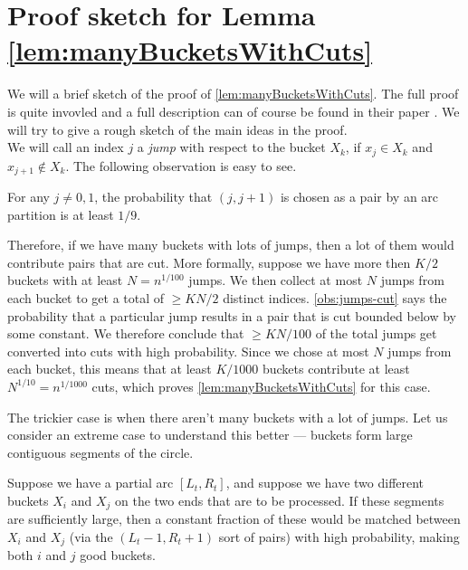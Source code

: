 \section{Proof sketch for Lemma \ref{lem:manyBucketsWithCuts}}

We will a brief sketch of the proof of \autoref{lem:manyBucketsWithCuts}.
The full proof is quite invovled and a full description can of course be found in their paper \cite{dmpy12}.
We will try to give a rough sketch of the main ideas in the proof. \\

We will call an index $j$ a \emph{jump} with respect to the bucket $X_k$, if $x_j \in X_k$ and $x_{j+1} \notin X_k$.
The following observation is easy to see.


\begin{observation}\label{obs:jumps-cut}
  For any $j\neq 0,1$, the probability that $(j,j+1)$ is chosen as a pair by an arc partition is at least $1/9$. 
\end{observation}

Therefore, if we have many buckets with lots of jumps, then a lot of them would contribute pairs that are cut.
More formally, suppose we have more then $K/2$ buckets with at least $N = n^{1/100}$ jumps.
We then collect at most $N$ jumps from each bucket to get a total of $\geq KN/2$ distinct indices.
\autoref{obs:jumps-cut} says the probability that a particular jump results in a pair that is cut bounded below by some constant.
We therefore conclude that $\geq KN/100$ of the total jumps get converted into cuts with high probability.
Since we chose at most $N$ jumps from each bucket, this means that at least $K/1000$ buckets contribute at least $N^{1/10} = n^{1/1000}$ cuts, which proves \autoref{lem:manyBucketsWithCuts} for this case.

\medskip

The trickier case is when there aren't many buckets with a lot of jumps.
Let us consider an extreme case to understand this better --- buckets form large contiguous segments of the circle.

Suppose we have a partial arc $[L_t,R_t]$, and suppose we have two different buckets $X_i$ and $X_j$ on the two ends that are to be processed.
If these segments are sufficiently large, then a constant fraction of these would be matched between $X_i$ and $X_j$ (via the $(L_t-1,R_t+1)$ sort of pairs) with high probability, making both $i$ and $j$ good buckets.

